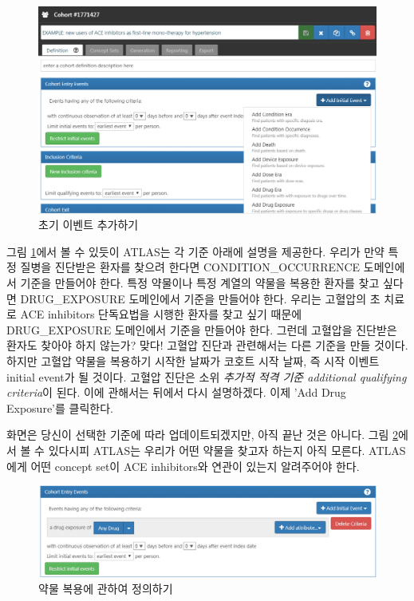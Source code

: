 \documentclass[10.5pt]{book}
\theoremstyle{definition}
\theoremstyle{definition}
\theoremstyle{definition}
\theoremstyle{remark}
\begin{document}
\begin{figure}

{\centering \includegraphics[width=1\linewidth]{images/Cohorts/ATLAS-initialevent} 

}

\caption{초기 이벤트 추가하기}\label{fig:ATLASinitialevent}
\end{figure}

그림 \ref{fig:ATLASinitialevent}에서 볼 수 있듯이 ATLAS는 각 기준 아래에
설명을 제공한다. 우리가 만약 특정 질병을 진단받은 환자를 찾으려 한다면
CONDITION\_OCCURRENCE 도메인에서 기준을 만들어야 한다. 특정 약물이나
특정 계열의 약물을 복용한 환자를 찾고 싶다면 DRUG\_EXPOSURE 도메인에서
기준을 만들어야 한다. 우리는 고혈압의 초 치료로 ACE inhibitors
단독요법을 시행한 환자를 찾고 싶기 때문에 DRUG\_EXPOSURE 도메인에서
기준을 만들어야 한다. 그런데 고혈압을 진단받은 환자도 찾아야 하지
않는가? 맞다! 고혈압 진단과 관련해서는 다른 기준을 만들 것이다. 하지만
고혈압 약물을 복용하기 시작한 날짜가 코호트 시작 날짜, 즉 시작 이벤트
initial event가 될 것이다. 고혈압 진단은 소위 \emph{추가적 적격 기준
additional qualifying criteria}이 된다. 이에 관해서는 뒤에서 다시
설명하겠다. 이제 'Add Drug Exposure'를 클릭한다.

화면은 당신이 선택한 기준에 따라 업데이트되겠지만, 아직 끝난 것은
아니다. 그림 \ref{fig:ATLASdrugexposure}에서 볼 수 있다시피 ATLAS는
우리가 어떤 약물을 찾고자 하는지 아직 모른다. ATLAS에게 어떤 concept
set이 ACE inhibitors와 연관이 있는지 알려주어야 한다.

\begin{figure}

{\centering \includegraphics[width=1\linewidth]{images/Cohorts/ATLAS-drugexposure} 

}

\caption{약물 복용에 관하여 정의하기}\label{fig:ATLASdrugexposure}
\end{figure}
\end{document}
